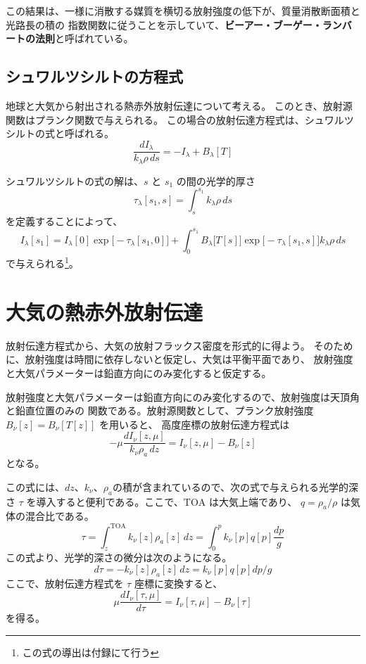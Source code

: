 \documentclass[article,twoside]{dennou777}
\newcommand{\hmemph}[1]{\textbf{#1}}
\begin{document}
この結果は、一様に消散する媒質を横切る放射強度の低下が、質量消散断面積と光路長の積の
指数関数に従うことを示していて、\hmemph{ビーアー・ブーゲー・ランバートの法則}と呼ばれている。


\subsection{シュワルツシルトの方程式}
地球と大気から射出される熱赤外放射伝達について考える。
このとき、放射源関数はプランク関数で与えられる。
この場合の放射伝達方程式は、シュワルツシルトの式と呼ばれる。
\begin{equation}
	\frac{dI_\lambda}{k_\lambda\rho\,ds}=-I_\lambda+B_\lambda[T]
\end{equation}

シュワルツシルトの式の解は、$s$ と $s_1$ の間の光学的厚さ
\begin{equation}
	\tau_\lambda[s_1,s]=\int^{s_1}_s k_\lambda\rho\,ds
\end{equation}
を定義することによって、
\begin{equation}
	I_\lambda[s_1]=I_\lambda[0]\exp\bigl[-\tau_\lambda[s_1,0]\bigr]+
	\int^{s_1}_{0}B_\lambda\bigl[T[s]\bigr]\exp\bigl[-\tau_\lambda[s_1,s]\bigr]k_\lambda\rho\,ds
\end{equation}
で与えられる\footnote{この式の導出は付録にて行う}。


\section{大気の熱赤外放射伝達}
放射伝達方程式から、大気の放射フラックス密度を形式的に得よう。
そのために、放射強度は時間に依存しないと仮定し、大気は平衡平面であり、
放射強度と大気パラメーターは鉛直方向にのみ変化すると仮定する。

放射強度と大気パラメーターは鉛直方向にのみ変化するので、放射強度は天頂角と鉛直位置のみの
関数である。放射源関数として、プランク放射強度 $B_\nu[z]=B_\nu[T[z]]$ を用いると、
高度座標の放射伝達方程式は
\begin{equation}
	-\mu\frac{dI_\nu[z,\mu]}{k_\nu\rho_a\,dz}=I_\nu[z,\mu]-B_\nu[z]
\end{equation}
となる。

この式には、$dz$、$k_\nu$、$\rho_a$の積が含まれているので、次の式で与えられる光学的深さ
$\tau$ を導入すると便利である。ここで、$\mathrm{TOA}$ は大気上端であり、
$q=\rho_a/\rho$ は気体の混合比である。
\begin{equation}
	\tau=\int^{\mathrm{TOA}}_{z} k_\nu[z]\rho_a[z]\,dz=\int^p_0 k_\nu[p]q[p]\frac{dp}{g}
\end{equation}
この式より、光学的深さの微分は次のようになる。
\begin{equation}
	d\tau=-k_\nu[z]\rho_a[z]\,dz=k_\nu[p]q[p]dp/g
\end{equation}
ここで、放射伝達方程式を $\tau$ 座標に変換すると、
\begin{equation}
	\mu\frac{dI_\nu[\tau,\mu]}{d\tau}=I_\nu[\tau,\mu]-B_\nu[\tau]
\end{equation}
を得る。
\end{document}
